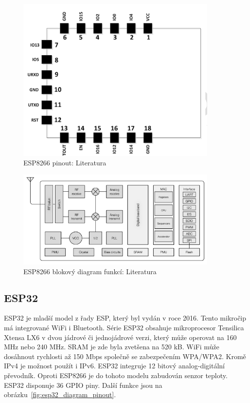 \documentclass[a4paper, 12pt]{report}
\begin{document}
    \begin{figure}[h]
        \centering
        \includegraphics[width=10cm]{images/ESP8266_piny}
        \caption{ESP8266 pinout: Literatura~\cite{WT8266}}
        \label{fig:esp8266_piny}
    \end{figure}
    \begin{figure}[h]
        \centering
        \includegraphics[width=10cm]{images/ESP8266_diagram}
        \caption{ESP8266 blokový diagram funkcí: Literatura~\cite{ESP8266}}
        \label{fig:esp8266_diagram}
    \end{figure}

    \subsection{ESP32}
    ESP32 je mladší model z řady ESP, který byl vydán v roce 2016.
    Tento mikročip má integrované WiFi i Bluetooth.
    Série ESP32 obsahuje mikroprocesor Tensilica Xtensa LX6 v dvou jádrové či jednojádrové verzi, který může operovat na 160 \si{MHz} nebo 240 \si{MHz}.
    SRAM je zde byla zvetšena na 520 \si{kB}.
    WiFi může dosáhnout rychlosti až 150 \si{Mbps} společně se zabezpečením WPA/WPA2. Kromě IPv4 je možnost použít i IPv6.
    ESP32 integruje 12 bitový analog-digitální převodník.
    Oproti ESP8266 je do tohoto modelu zabudován senzor teploty.
    ESP32 disponuje 36 GPIO piny.
    Další funkce jsou na obrázku~\ref{fig:esp32_diagram_pinout}. \\
\end{document}
